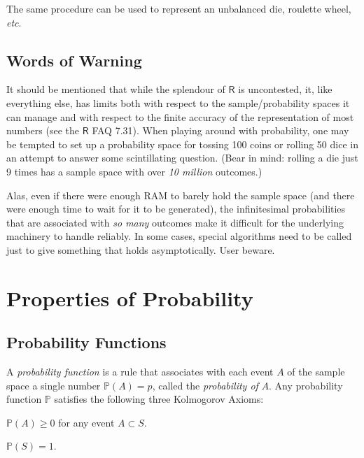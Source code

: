 The same procedure can be used to represent an unbalanced die,
roulette wheel, \emph{etc}.

\subsection{Words of Warning}
\label{sec-4-3-5}

It should be mentioned that while the splendour of \(\mathsf{R}\) is
uncontested, it, like everything else, has limits both with respect to
the sample/probability spaces it can manage and with respect to the
finite accuracy of the representation of most numbers (see the
\(\mathsf{R}\) FAQ 7.31). When playing around with probability, one
may be tempted to set up a probability space for tossing 100 coins or
rolling 50 dice in an attempt to answer some scintillating
question. (Bear in mind: rolling a die just 9 times has a sample space
with over \emph{10 million} outcomes.)

Alas, even if there were enough RAM to barely hold the sample space
(and there were enough time to wait for it to be generated), the
infinitesimal probabilities that are associated with \emph{so many}
outcomes make it difficult for the underlying machinery to handle
reliably. In some cases, special algorithms need to be called just to
give something that holds asymptotically. User beware.

\section{Properties of Probability}
\label{sec-4-4}

\subsection{Probability Functions}
\label{sec-4-4-1}

A \emph{probability function} is a rule that associates with each event
\(A\) of the sample space a single number \(\mathbb{P}(A)=p\), called
the \emph{probability of} \(A\). Any probability function \(\mathbb{P}\)
satisfies the following three Kolmogorov Axioms:

\begin{ax}
\label{ax-prob-nonnegative} \(\mathbb{P}(A)\geq0\) for any event \(A\subset S\).
\end{ax}

\begin{ax}
\label{ax-total-mass-one} \(\mathbb{P}(S)=1\).
\end{ax}

